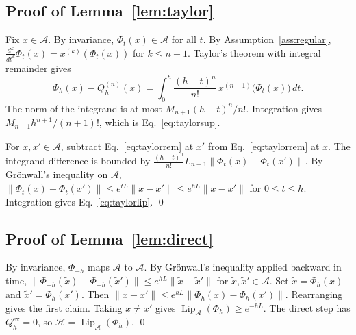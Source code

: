 \documentclass[11pt]{article}
\theoremstyle{definition}
\theoremstyle{remark}
\newcommand{\Aset}{\mathcal{A}}          %
\newcommand{\Hard}{\mathcal{H}}          %
\newcommand{\Lip}{\operatorname{Lip}_{\Aset}}
\newcommand{\ex}{\mathrm{ex}}
\begin{document}
\subsection{Proof of Lemma~\ref{lem:taylor}}\label{app:taylor}
Fix $x \in \Aset$.
By invariance, $\Phi_t(x) \in \Aset$ for all $t$.
By Assumption~\ref{ass:regular}, $\frac{d^k}{dt^k}\Phi_t(x) = x^{(k)}(\Phi_t(x))$ for $k \le n+1$.
Taylor's theorem with integral remainder gives
\begin{equation}\label{eq:taylorrem}
\Phi_h(x) - Q^{(n)}_h(x) = \int_0^h \frac{(h-t)^n}{n!}\, x^{(n+1)}\big(\Phi_t(x)\big)\,dt.
\end{equation}
The norm of the integrand is at most $M_{n+1}(h-t)^n/n!$.
Integration gives $M_{n+1} h^{n+1}/(n+1)!$, which is Eq.~\eqref{eq:taylorsup}.

For $x, x' \in \Aset$, subtract Eq.~\eqref{eq:taylorrem} at $x'$ from Eq.~\eqref{eq:taylorrem} at $x$.
The integrand difference is bounded by $\frac{(h-t)^n}{n!} L_{n+1}\|\Phi_t(x) - \Phi_t(x')\|$.
By Gr\"onwall's inequality on $\Aset$, $\|\Phi_t(x) - \Phi_t(x')\| \le e^{tL}\|x - x'\| \le e^{hL}\|x - x'\|$ for $0 \le t \le h$.
Integration gives Eq.~\eqref{eq:taylorlip}. \qed

\subsection{Proof of Lemma~\ref{lem:direct}}\label{app:direct}
By invariance, $\Phi_{-h}$ maps $\Aset$ to $\Aset$.
By Gr\"onwall's inequality applied backward in time, $\|\Phi_{-h}(\tilde x) - \Phi_{-h}(\tilde x')\| \le e^{hL}\|\tilde x - \tilde x'\|$ for $\tilde x, \tilde x' \in \Aset$.
Set $\tilde x = \Phi_h(x)$ and $\tilde x' = \Phi_h(x')$.
Then $\|x - x'\| \le e^{hL}\|\Phi_h(x) - \Phi_h(x')\|$.
Rearranging gives the first claim.
Taking $x \ne x'$ gives $\Lip(\Phi_h) \ge e^{-hL}$.
The direct step has $Q_h^\ex = 0$, so $\Hard = \Lip(\Phi_h)$. \qed
\end{document}
